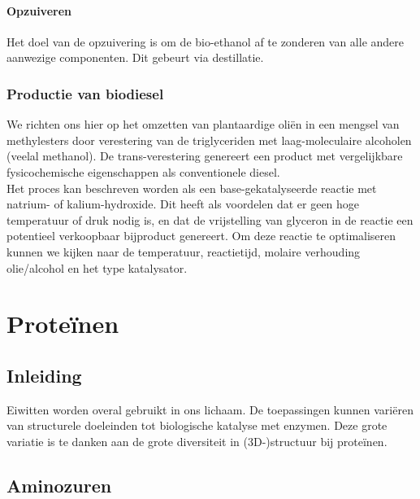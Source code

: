 \documentclass[a4paper,kul]{kulakarticle} %
\begin{document}
\paragraph{Opzuiveren}
Het doel van de opzuivering is om de bio-ethanol af te zonderen van alle andere aanwezige componenten. Dit gebeurt via destillatie. 
\subsubsection{Productie van biodiesel}
We richten ons hier op het omzetten van plantaardige oliën in een mengsel van methylesters door verestering van de triglyceriden met laag-moleculaire alcoholen (veelal methanol). De trans-verestering genereert een product met vergelijkbare fysicochemische eigenschappen als conventionele diesel. 
\\
Het proces kan beschreven worden als een base-gekatalyseerde reactie met natrium- of kalium-hydroxide. Dit heeft als voordelen dat er geen hoge temperatuur of druk nodig is, en dat de vrijstelling van glyceron in de reactie een potentieel verkoopbaar bijproduct genereert. Om deze reactie te optimaliseren kunnen we kijken naar de temperatuur, reactietijd, molaire verhouding olie/alcohol en het type katalysator.
\newpage
\section{Proteïnen}
\subsection{Inleiding}
Eiwitten worden overal gebruikt in ons lichaam. De toepassingen kunnen variëren van structurele doeleinden tot biologische katalyse met enzymen. Deze grote variatie is te danken aan de grote diversiteit in (3D-)structuur bij proteïnen. 
\subsection{Aminozuren}
\end{document}
